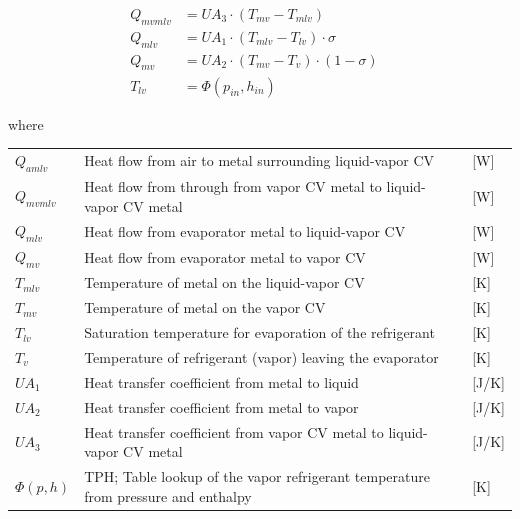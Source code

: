 \begin{align}
	Q_{mvmlv} & = U A_3 \cdot (T_{mv} - T_{mlv}) \label{eq:Q_mvml}             &  \\
	Q_{mlv}   & = U A_1 \cdot (T_{mlv} - T_{lv}) \cdot \sigma	\label{eq:Q_ml}&  \\
	Q_{mv}    & = U A_2 \cdot (T_{mv} - T_v) \cdot (1- \sigma) \label{eq:Q_mv} &  \\
	T_{lv}    & = \Phi(p_{in}, h_{in}) \label{eq:T_v}                          &
\end{align}

where

\begin{center}
	\begin{tabular}{l p{10cm} l}
		$Q_{amlv}$  & Heat flow from air to metal surrounding liquid-vapor CV                           & [\si{W}]        \\
		$Q_{mvmlv}$ & Heat flow from through from vapor CV metal to liquid-vapor CV metal               & [\si{W}]        \\
		$Q_{mlv}$   & Heat flow from evaporator metal to liquid-vapor CV                                & [\si{W}]        \\
		$Q_{mv}$    & Heat flow from evaporator metal to vapor CV                                       & [\si{W}]        \\
		$T_{mlv}$   & Temperature of metal on the liquid-vapor CV                                       & [\si{K}]        \\
		$T_{mv}$    & Temperature of metal on the vapor CV                                              & [\si{K}]        \\
		$T_{lv}$    & Saturation temperature for evaporation of the refrigerant                         & [\si{K}]        \\
		$T_{v}$     & Temperature of refrigerant (vapor) leaving the evaporator                         & [\si{K}]        \\
		$UA_1$      & Heat transfer coefficient from metal to liquid                                    & [\si{J}/\si{K}] \\
		$UA_2$      & Heat transfer coefficient from metal to vapor                                     & [\si{J}/\si{K}] \\
		$UA_3$      & Heat transfer coefficient from vapor CV metal to liquid-vapor CV metal            & [\si{J}/\si{K}] \\
		$\Phi(p,h)$ 		& TPH; Table lookup of the vapor refrigerant temperature from pressure and enthalpy & [\si{K}]
	\end{tabular}
\end{center}

